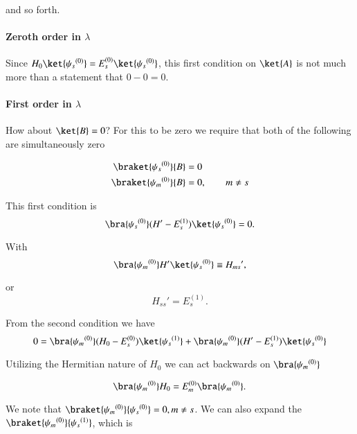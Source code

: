 and so forth.

\paragraph{Zeroth order in $\lambda$}

Since $H_0 \ket{{\psi_s}^{(0)}} = E_s^{(0)} \ket{{\psi_s}^{(0)}}$, this first condition on $\ket{A}$ is not much more than a statement that $0 - 0 = 0$.  

\paragraph{First order in $\lambda$}

How about $\ket{B} = 0$?  For this to be zero we require that both of the following are simultaneously zero

\begin{align}\label{eqn:qmTwoL4:460}
\braket{{\psi_s}^{(0)}}{B} &= 0 \\
\braket{{\psi_m}^{(0)}}{B} &= 0, \qquad m \ne s
\end{align}

This first condition is
\begin{equation}\label{eqn:qmTwoL4:480}
\bra{{\psi_s}^{(0)}} (H' - E_s^{(1)}) \ket{{\psi_s}^{(0)}} = 0.
\end{equation}

With
\begin{equation}\label{eqn:qmTwoL4:500}
\bra{{\psi_m}^{(0)}} H' \ket{{\psi_s}^{(0)}} \equiv {H_{ms}}',
\end{equation}

or
\begin{equation}\label{eqn:qmTwoL4:520}
{H_{ss}}' = E_s^{(1)}.
\end{equation}

From the second condition we have
\begin{equation}\label{eqn:qmTwoL4:540}
0 = \bra{{\psi_m}^{(0)}} 
(H_0 - E_s^{(0)}) \ket{{\psi_s}^{(1)}} 
+\bra{{\psi_m}^{(0)}} 
(H' - E_s^{(1)}) \ket{{\psi_s}^{(0)}} 
\end{equation}

Utilizing the Hermitian nature of $H_0$ we can act backwards on $\bra{{\psi_m}^{(0)}}$ 

\begin{equation}\label{eqn:qmTwoL4:560}
\bra{{\psi_m}^{(0)}} H_0
=
E_m^{(0)} \bra{{\psi_m}^{(0)}}.
\end{equation}

We note that $\braket{{\psi_m}^{(0)}}{{\psi_s}^{(0)}} = 0, m \ne s$.  We can also expand the $\braket{{\psi_m}^{(0)}}{{\psi_s}^{(1)}}$, which is

